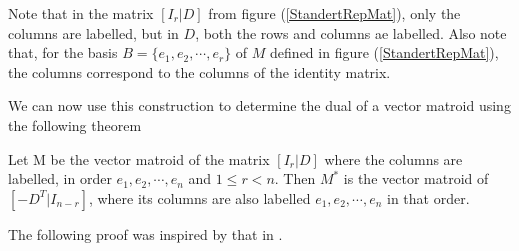 Note that in the matrix $[I_r|D]$ from figure (\ref{StandertRepMat}),  only the columns are labelled, but in $D$, both the rows and columns ae labelled. Also note that, for the basis $B=\{e_1, e_2,\cdots,e_r\}$ of $M$ defined in figure (\ref{StandertRepMat}), the columns correspond to the columns of the identity matrix.

We can now use this construction to determine the dual of a vector matroid using the following theorem

\begin{theorem}\label{DualRepMat}
    Let M be the vector matroid of the matrix $[I_r|D]$ where the columns are labelled, in order $e_1, e_2,\cdots,e_n$ and $1\leq r< n$. Then $M^*$ is the vector matroid of $[-D^T|I_{n-r}]$, where its columns are also labelled $e_1, e_2,\cdots,e_n$ in that order.
\end{theorem}

The following proof was inspired by that in \cite[p. 78]{oxley1}.

